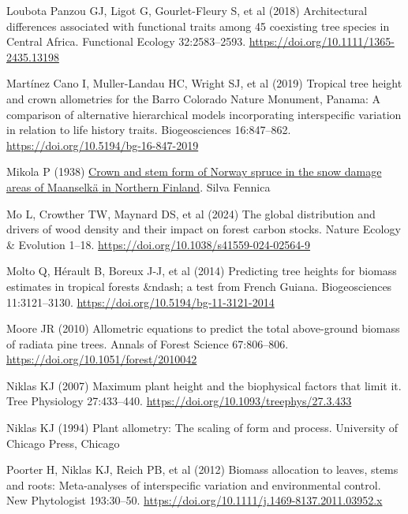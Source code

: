 \documentclass[
  12pt,
  letterpaper,
  DIV=11,
  numbers=noendperiod]{scrartcl}
\newlength{\cslhangindent}
\newlength{\cslentryspacingunit} %
\newenvironment{CSLReferences}[2] %
 {%
  \setlength{\parindent}{0pt}
  \ifodd #1
  \let\oldpar\par
  \def\par{\hangindent=\cslhangindent\oldpar}
  \fi
  \setlength{\parskip}{#2\cslentryspacingunit}
 }%
 {}
\begin{document}
\begin{CSLReferences}{1}{0}
\leavevmode{}%
Loubota Panzou GJ, Ligot G, Gourlet-Fleury S, et al (2018) Architectural
differences associated with functional traits among 45 coexisting tree
species in {Central} {Africa}. Functional Ecology 32:2583--2593.
\url{https://doi.org/10.1111/1365-2435.13198}

\leavevmode{}%
Martínez Cano I, Muller-Landau HC, Wright SJ, et al (2019) Tropical tree
height and crown allometries for the {Barro} {Colorado} {Nature}
{Monument}, {Panama}: A comparison of alternative hierarchical models
incorporating interspecific variation in relation to life history
traits. Biogeosciences 16:847--862.
\url{https://doi.org/10.5194/bg-16-847-2019}

\leavevmode{}%
Mikola P (1938) \href{https://www.silvafennica.fi/article/4546}{Crown
and stem form of {Norway} spruce in the snow damage areas of {Maanselkä}
in {Northern} {Finland}}. Silva Fennica

\leavevmode{}%
Mo L, Crowther TW, Maynard DS, et al (2024) The global distribution and
drivers of wood density and their impact on forest carbon stocks. Nature
Ecology \& Evolution 1--18.
\url{https://doi.org/10.1038/s41559-024-02564-9}

\leavevmode{}%
Molto Q, Hérault B, Boreux J-J, et al (2014) Predicting tree heights for
biomass estimates in tropical forests \&ndash; a test from {French}
{Guiana}. Biogeosciences 11:3121--3130.
\url{https://doi.org/10.5194/bg-11-3121-2014}

\leavevmode{}%
Moore JR (2010) Allometric equations to predict the total above-ground
biomass of radiata pine trees. Annals of Forest Science 67:806--806.
\url{https://doi.org/10.1051/forest/2010042}

\leavevmode{}%
Niklas KJ (2007) Maximum plant height and the biophysical factors that
limit it. Tree Physiology 27:433--440.
\url{https://doi.org/10.1093/treephys/27.3.433}

\leavevmode{}%
Niklas KJ (1994) Plant allometry: The scaling of form and process.
University of Chicago Press, Chicago

\leavevmode{}%
Poorter H, Niklas KJ, Reich PB, et al (2012) Biomass allocation to
leaves, stems and roots: Meta-analyses of interspecific variation and
environmental control. New Phytologist 193:30--50.
\url{https://doi.org/10.1111/j.1469-8137.2011.03952.x}


\end{CSLReferences}
\end{document}
